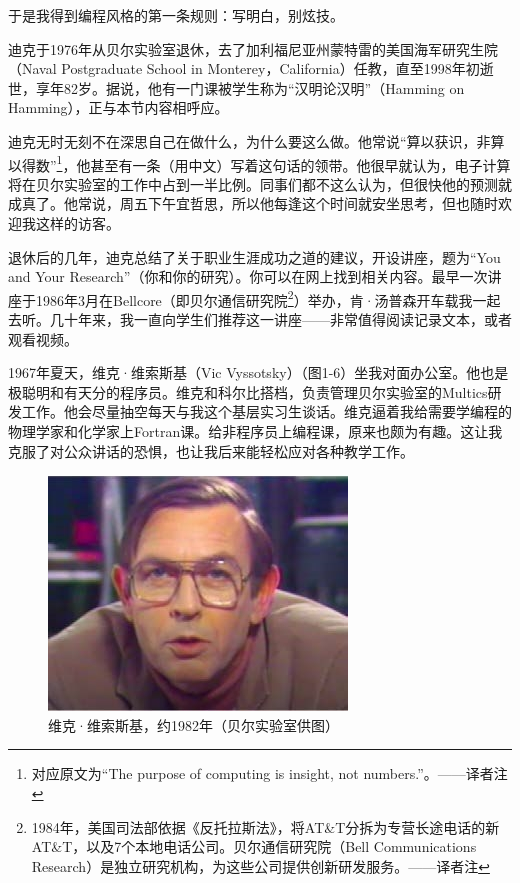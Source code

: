 \documentclass[a4paper,12pt,UTF8,twoside]{ctexbook}
\begin{document}
于是我得到编程风格的第一条规则：写明白，别炫技。

迪克于1976年从贝尔实验室退休，去了加利福尼亚州蒙特雷的美国海军研究生院（Naval Postgraduate School in Monterey，California）任教，直至1998年初逝世，享年82岁。据说，他有一门课被学生称为“汉明论汉明”（Hamming on Hamming），正与本节内容相呼应。

迪克无时无刻不在深思自己在做什么，为什么要这么做。他常说“算以获识，非算以得数”\footnote{对应原文为“The purpose of computing is insight, not numbers.”。——译者注}，他甚至有一条（用中文）写着这句话的领带。他很早就认为，电子计算将在贝尔实验室的工作中占到一半比例。同事们都不这么认为，但很快他的预测就成真了。他常说，周五下午宜哲思，所以他每逢这个时间就安坐思考，但也随时欢迎我这样的访客。

退休后的几年，迪克总结了关于职业生涯成功之道的建议，开设讲座，题为“You and Your Research”（你和你的研究）。你可以在网上找到相关内容。最早一次讲座于1986年3月在Bellcore（即贝尔通信研究院\footnote{1984年，美国司法部依据《反托拉斯法》，将AT\&T分拆为专营长途电话的新AT\&T，以及7个本地电话公司。贝尔通信研究院（Bell Communications Research）是独立研究机构，为这些公司提供创新研发服务。——译者注}）举办，肯·汤普森开车载我一起去听。几十年来，我一直向学生们推荐这一讲座——非常值得阅读记录文本，或者观看视频。

1967年夏天，维克·维索斯基（Vic Vyssotsky）（图1-6）坐我对面办公室。他也是极聪明和有天分的程序员。维克和科尔比搭档，负责管理贝尔实验室的Multics研发工作。他会尽量抽空每天与我这个基层实习生谈话。维克逼着我给需要学编程的物理学家和化学家上Fortran课。给非程序员上编程课，原来也颇为有趣。这让我克服了对公众讲话的恐惧，也让我后来能轻松应对各种教学工作。

\begin{figure}[htbp]
	\centering
	\includegraphics[width=0.7\linewidth]{6}
	\caption{维克·维索斯基，约1982年（贝尔实验室供图）}
	\label{fig:1}
\end{figure}
\end{document}
